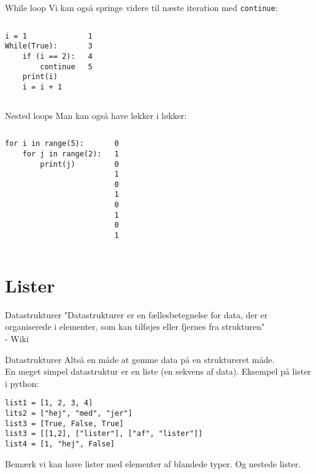 \begin{frame}[fragile]{While loop}
	Vi kan også springe videre til næste iteration med \texttt{continue}:
	\begin{columns}
		\begin{lstlisting}[style=python]
i = 1
While(True):
	if (i == 2):
		continue
	print(i)
	i = i + 1
		\end{lstlisting}
		\begin{lstlisting}[style=python]
1
3
4
5
		\end{lstlisting}
	\end{columns}
\end{frame}

\begin{frame}[fragile]{Nested loops}
	Man kan også have løkker i løkker:
	\begin{columns}
		\column{0.4\textwidth}
		\begin{lstlisting}[style=python]
for i in range(5):
	for j in range(2):
		print(j)
		\end{lstlisting}
		\pause
		\column{0.4\textwidth}
		\begin{lstlisting}[style=python]
0
1
0
1
0
1
0
1
0
1
		\end{lstlisting}
	\end{columns}
\end{frame}

\section{Lister}

\begin{frame}{Datastrukturer}
	\Large
	"Datastrukturer er en fællesbetegnelse for data, der er organiserede i elementer, som kan tilføjes eller fjernes fra strukturen"\\
	 - Wiki
\end{frame}


\begin{frame}[fragile]{Datastrukturer}
	Altså en måde at gemme data på en struktureret måde.\\
	En meget simpel datastruktur er en liste (en sekvens af data).
	\vfill
	Eksempel på lister i python:
	\begin{lstlisting}[style=python]
list1 = [1, 2, 3, 4]
lits2 = ["hej", "med", "jer"]
list3 = [True, False, True]
list3 = [[1,2], ["lister"], ["af", "lister"]]
list4 = [1, "hej", False]
	\end{lstlisting}
	Bemærk vi kan have lister med elementer af blandede typer. Og nestede lister.
\end{frame}

